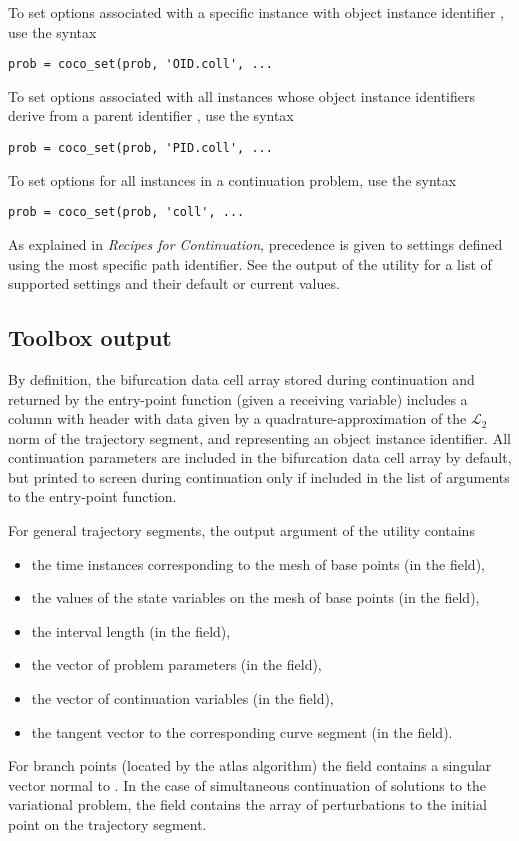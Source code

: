To set options associated with a specific  instance with object instance identifier , use the syntax
\begin{lstlisting}[language=coco-highlight]
prob = coco_set(prob, 'OID.coll', ...
\end{lstlisting}
To set options associated with all  instances whose object instance identifiers derive from a parent identifier , use the syntax
\begin{lstlisting}[language=coco-highlight]
prob = coco_set(prob, 'PID.coll', ...
\end{lstlisting}
To set options for all  instances in a continuation problem, use the syntax 
\begin{lstlisting}[language=coco-highlight]
prob = coco_set(prob, 'coll', ...
\end{lstlisting}
As explained in \emph{Recipes for Continuation}, precedence is given to settings defined using the most specific path identifier. See the output of the  utility for a list of supported settings and their default or current values.

\subsection{Toolbox output}
By definition, the bifurcation data cell array stored during continuation and returned by the  entry-point function (given a receiving variable) includes a column with header  with data given by a quadrature-approximation of the $\mathcal{L}_2$ norm of the trajectory segment, and  representing an object instance identifier. All continuation parameters are included in the bifurcation data cell array by default, but printed to screen during continuation only if included in the list of arguments to the  entry-point function.

For general trajectory segments,  the  output argument of the  utility contains
\begin{itemize}
\item the time instances corresponding to the mesh of base points (in the  field),
\item the values of the state variables on the mesh of base points (in the  field),
\item the interval length (in the  field),
\item the vector of problem parameters (in the  field),
\item the vector of continuation variables (in the  field),
\item the tangent vector to the corresponding curve segment (in the  field).
\end{itemize}
For branch points (located by the atlas algorithm) the  field contains a singular vector normal to . In the case of simultaneous continuation of solutions to the variational problem, the field  contains the array of perturbations to the initial point on the trajectory segment.

